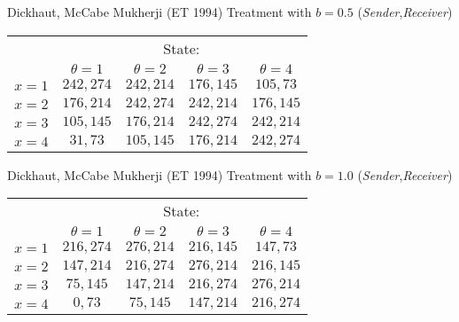 \documentclass{beamer}
\begin{document}
\begin{frame}{Dickhaut, McCabe Mukherji (ET 1994)}
Treatment with $b=0.5$ (\emph{Sender},\emph{Receiver})

\begin{center}
	\begin{tabular}{r|c|c|c|c|}
			\multicolumn{1}{r}{ }& \multicolumn{4}{c}{State:}		\\
			\multicolumn{1}{r}{ }& \multicolumn{1}{c}{$\theta=1$}  & \multicolumn{1}{c}{$\theta=2$} & \multicolumn{1}{c}{$\theta=3$}& \multicolumn{1}{c}{$\theta=4$} \\ \cline{2-5}
			$x=1$ &  $242,274$ & $242,214$  & $176,145$ & $105,73$  \\ \cline{2-5}
			$x=2$ &  $176,214$ & $242,274$  & $242,214$ & $176,145$ \\ \cline{2-5}
			$x=3$ &  $105,145$ & $176,214$  & $242,274$ & $242,214$  \\ \cline{2-5}
			$x=4$ &  $31,73$   & $105,145$  & $176,214$ & $242,274$    \\ \cline{2-5}
		\end{tabular}
	\end{center}
\end{frame}

\begin{frame}{Dickhaut, McCabe Mukherji (ET 1994)}
Treatment with $b=1.0$ (\emph{Sender},\emph{Receiver})

\begin{center}
	\begin{tabular}{r|c|c|c|c|}
			\multicolumn{1}{r}{ }& \multicolumn{4}{c}{State:}		\\
			\multicolumn{1}{r}{ }& \multicolumn{1}{c}{$\theta=1$}  & \multicolumn{1}{c}{$\theta=2$} & \multicolumn{1}{c}{$\theta=3$}& \multicolumn{1}{c}{$\theta=4$} \\ \cline{2-5}
			$x=1$ &  $216,274$ & $276,214$  & $216,145$ & $147,73$  \\ \cline{2-5}
			$x=2$ &  $147,214$ & $216,274$  & $276,214$ & $216,145$ \\ \cline{2-5}
			$x=3$ &  $75,145$  & $147,214$  & $216,274$ & $276,214$  \\ \cline{2-5}
			$x=4$ &  $0,73$    & $75,145$   & $147,214$ & $216,274$    \\ \cline{2-5}
		\end{tabular}
	\end{center}
\end{frame}
\end{document}
